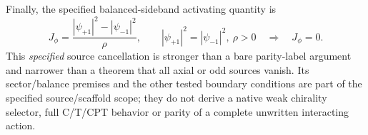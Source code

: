 \documentclass[11pt]{article}
\theoremstyle{definition}
\begin{document}
Finally, the specified balanced-sideband activating quantity is
\begin{equation}
 J_\phi=\frac{|\psi_{+1}|^2-|\psi_{-1}|^2}{\rho},
 \qquad
 |\psi_{+1}|^2=|\psi_{-1}|^2,\ \rho>0
 \quad\Longrightarrow\quad J_\phi=0.
 \label{eq:balanced_sideband_inactive}
\end{equation}
This \emph{specified} source cancellation is stronger than a bare parity-label
argument and narrower than a theorem that all axial or odd sources vanish.
Its sector/balance premises and the other tested boundary conditions are
part of the specified source/scaffold scope; they do not derive a
native weak chirality selector, full C/T/CPT behavior or parity of a complete
unwritten interacting action.


\newpage
\printbibliography
\end{document}
